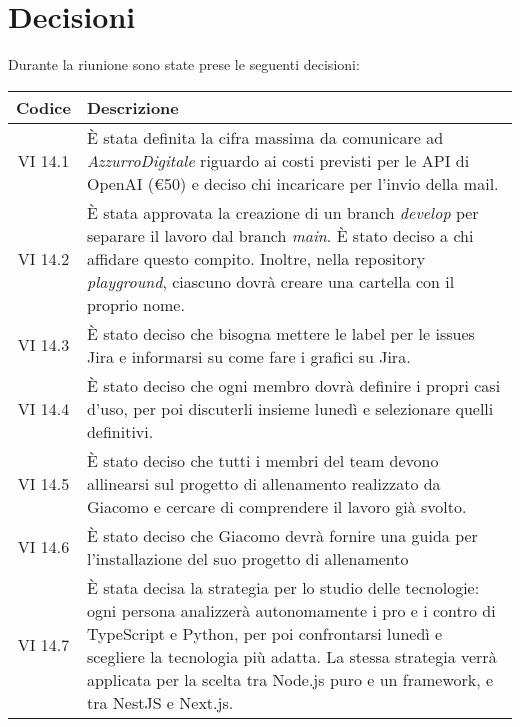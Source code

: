 
\section{Decisioni}

Durante la riunione sono state prese le seguenti decisioni:

\vspace{0.5cm}

\begin{table}[htbp]
    \centering
    \begin{tabular}{|c|p{}|}
        \hline
        \rowcolor[gray]{0.75}
        \textbf{Codice} & \textbf{Descrizione}\\
        \hline
        VI 14.1 & È stata definita la cifra massima da comunicare ad \emph{AzzurroDigitale} riguardo ai costi previsti per le API di OpenAI (€50) e deciso chi incaricare per l'invio della mail.\\
        \hline
        VI 14.2 & È stata approvata la creazione di un branch \emph{develop} per separare il lavoro dal branch \emph{main}. È stato deciso a chi affidare questo compito. Inoltre, nella repository \emph{playground}, ciascuno dovrà creare una cartella con il proprio nome.\\
        \hline
        VI 14.3 & È stato deciso che bisogna mettere le label per le issues Jira e informarsi su come fare i grafici su Jira.\\
        \hline
        VI 14.4 & È stato deciso che ogni membro dovrà definire i propri casi d'uso, per poi discuterli insieme lunedì e selezionare quelli definitivi.\\
        \hline
        VI 14.5 & È stato deciso che tutti i membri del team devono allinearsi sul progetto di allenamento realizzato da Giacomo e cercare di comprendere il lavoro già svolto.\\
        \hline
        VI 14.6 & È stato deciso che Giacomo devrà fornire una guida per l'installazione del suo progetto di allenamento\\
        \hline
        VI 14.7 & È stata decisa la strategia per lo studio delle tecnologie: ogni persona analizzerà autonomamente i pro e i contro di TypeScript e Python, per poi confrontarsi lunedì e scegliere la tecnologia più adatta. La stessa strategia verrà applicata per la scelta tra Node.js puro e un framework, e tra NestJS e Next.js.\\

\end{tabular}
\end{table}
